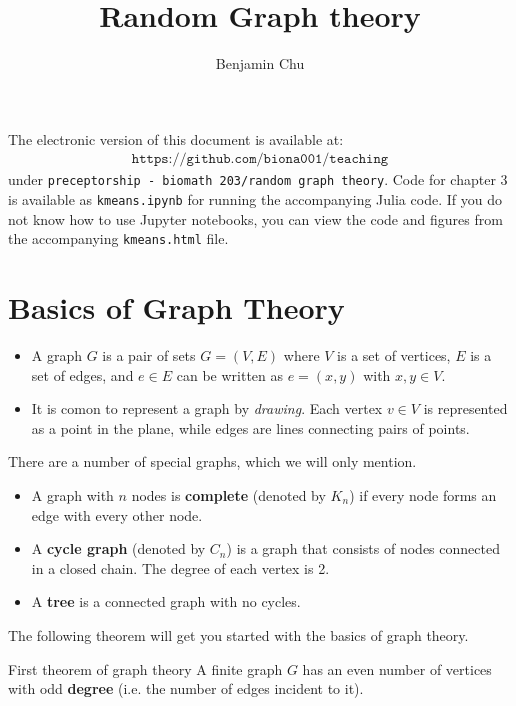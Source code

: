\documentclass[./some_latex_template.tex]{subfiles}
\begin{document}
\title{Random Graph theory}
\author{Benjamin Chu}
\maketitle

\singlespacing

\noindent The electronic version of this document is available at:
\begin{align*}
\texttt{https://github.com/biona001/teaching}
\end{align*}
under \texttt{preceptorship - biomath 203/random graph theory}. Code for chapter 3 is available as \texttt{kmeans.ipynb} for running the accompanying Julia code. If you do not know how to use Jupyter notebooks, you can view the code and figures from the accompanying \texttt{kmeans.html} file. 

\section{Basics of Graph Theory}

\begin{itemize}
	\item A graph $G$ is a pair of sets $G = (V, E)$ where $V$ is a set of vertices, $E$ is a set of edges, and $e \in E$ can be written as $e = (x, y)$ with $x, y \in V$. 
	\item It is comon to represent a graph by \textit{drawing}. Each vertex $v \in V$ is represented as a point in the plane, while edges are lines connecting pairs of points. 
\end{itemize}

\noindent There are a number of special graphs, which we will only mention. 
\begin{itemize}
	\item A graph with $n$ nodes is \textbf{complete} (denoted by $K_n$) if every node forms an edge with every other node. 
	\item A \textbf{cycle graph} (denoted by $C_n$) is a graph that consists of nodes connected in a closed chain. The degree of each vertex is 2. 
	\item A \textbf{tree} is a connected graph with no cycles. 
\end{itemize}

\noindent The following theorem will get you started with the basics of graph theory.

\begin{theorembox}{First theorem of graph theory}{}
A finite graph $G$ has an even number of vertices with odd \textbf{degree} (i.e. the number of edges incident to it).
\end{theorembox}
\end{document}

